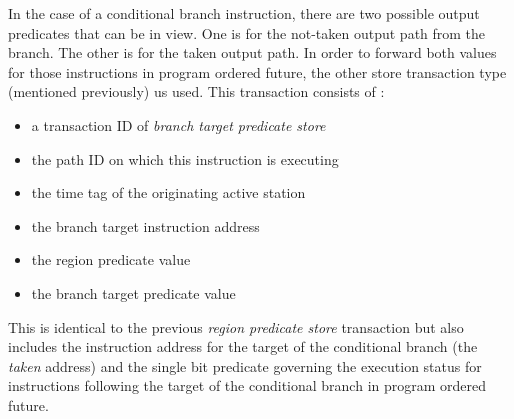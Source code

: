 \documentclass[10pt,dvips]{article}
\begin{document}
In the case of a conditional branch instruction,
there are two possible output predicates that can be in
view.  One is for the not-taken output path from the branch.
The other is for the taken output path.
In order to forward both values for those instructions
in program ordered future, the other store transaction
type (mentioned previously) us used.
This transaction consists of :
%
\vspace{-0.05in}
\begin{itemize}
\vspace{-0.1in}
\item{a transaction ID of \textit{branch target predicate store}}
\vspace{-0.1in}
\item{the path ID on which this instruction is executing}
\vspace{-0.1in}
\item{the time tag of the originating active station}
\vspace{-0.1in}
\item{the branch target instruction address}
\vspace{-0.1in}
\item{the region predicate value}
\vspace{-0.1in}
\item{the branch target predicate value}
\vspace{-0.1in}
\end{itemize}   
%
This is identical to the previous \textit{region predicate store}
transaction but also includes the instruction address
for the target of the conditional branch (the \textit{taken} address)
and the single bit predicate
governing the execution status for instructions
following the target of the conditional branch in program ordered
future.
\end{document}
